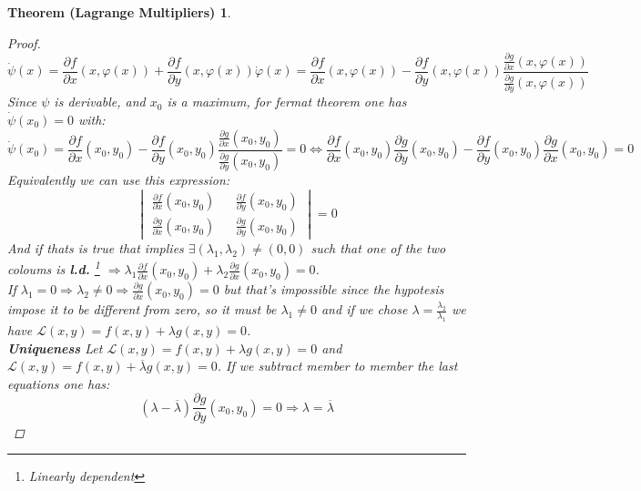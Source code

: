 \documentclass{article}
\newtheorem*{lagrangemult}{Theorem (Lagrange Multipliers)}
\begin{document}
\begin{lagrangemult}
\begin{proof}
                \begin{equation*}
                    \dot{\psi}(x) = \frac{\partial f}{\partial x}(x,\varphi (x)) + \frac{\partial f}{\partial y}(x,\varphi (x)) \dot{\varphi} (x) = \frac{\partial f}{\partial x}(x,\varphi (x)) - \frac{\partial f}{\partial y}(x,\varphi (x)) \frac{\frac{\partial g}{\partial x}(x,\varphi (x))}{\frac{\partial g}{\partial y}(x,\varphi (x))}
                \end{equation*}
                Since $\psi$ is derivable, and $x_0$ is a maximum, for fermat theorem one has $\dot{\psi}(x_0)=0$ with: 
                \begin{equation*}
                    \dot{\psi}(x_0) = \frac{\partial f}{\partial x}(x_0,y_0) - \frac{\partial f}{\partial y}(x_0,y_0) \frac{\frac{\partial g}{\partial x}(x_0,y_0)}{\frac{\partial g}{\partial y}(x_0,y_0)} = 0 \Longleftrightarrow  \frac{\partial f}{\partial x}(x_0,y_0)\frac{\partial g}{\partial y}(x_0,y_0) - \frac{\partial f}{\partial y}(x_0,y_0)\frac{\partial g}{\partial x}(x_0,y_0) = 0
                \end{equation*}
                Equivalently we can use this expression:
                \begin{equation*}
                    \begin{vmatrix}
                        \frac{\partial f}{\partial x}(x_0,y_0) && \frac{\partial f}{\partial y}(x_0,y_0) \\
                        \frac{\partial g}{\partial x}(x_0,y_0) && \frac{\partial g}{\partial y}(x_0,y_0)
                    \end{vmatrix} = 0
                \end{equation*}
                And if thats is true that implies $\exists (\lambda_1, \lambda_2) \neq (0,0)$ such that one of the two coloums is \textbf{l.d.} \footnote{Linearly dependent} $\Longrightarrow \lambda_1\frac{\partial f}{\partial x}(x_0,y_0) + \lambda_2\frac{\partial g}{\partial x}(x_0,y_0) = 0$. \\
                If $\lambda_1 = 0 \Rightarrow \lambda_2 \neq 0 \Rightarrow \frac{\partial g}{\partial x}(x_0,y_0) = 0$ but that's impossible since the hypotesis impose it to be different from zero, so it must be $\lambda_1 \neq 0$ and if we chose $\lambda = \frac{\lambda_2}{\lambda_1}$ we have $\mathcal{L} (x,y) = f(x,y) + \lambda g(x,y) = 0$. \\
                \textbf{Uniqueness} Let $\mathcal{L} (x,y) = f(x,y) + \lambda g(x,y) = 0$ and $\mathcal{L} (x,y) = f(x,y) + \overline{\lambda}  g(x,y) = 0$. If we subtract member to member the last equations one has: 
                \begin{equation*}
                    \left( \lambda - \overline{\lambda} \right) \frac{\partial g}{\partial y}(x_0,y_0) = 0 \Rightarrow  \lambda = \overline{\lambda}
                \end{equation*}
            \end{proof} 
        \end{lagrangemult}
\end{document}
